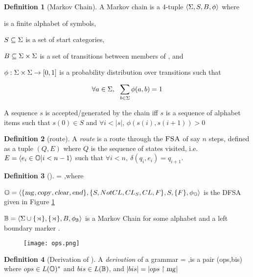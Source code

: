 \documentclass[12pt]{article}
\theoremstyle{definition}
\newtheorem{definition}{Definition}[section]
\begin{document}
\begin{definition}[Markov Chain]
  A Markov chain is a 4-tuple $\langle \Sigma, S, B, \phi  \rangle $ where 

\sg  is a finite alphabet of symbols, 

$S\subseteq \Sigma$ is a set of start categories,
 
$B\subseteq \Sigma\times\Sigma$ is a set of transitions between members of \sg, and

$\phi: \Sigma \times \Sigma \rightarrow [0,1]$ is a probability distribution over transitions such that

$$\forall a\in \Sigma,~~\sum_{b\in\Sigma} \phi(a,b) = 1 $$


A sequence $s$ is accepted/generated by the chain iff $s$ is a sequence of alphabet items such that $s(0) \in S$ and $\forall i<|s|$, $\phi(s(i),s(i+1))>0$ 

\end{definition}

\begin{definition}[route]
  A \emph{route} is a route through the $\textsc{FSA}$ of say $n$ steps, defined as a tuple $(Q,E)$ where $Q$ is the sequence of states visited, i.e.
 $E=\langle e_i\in\mathbb{O}|i<n-1\rangle$ such that $\forall i<n,~ \delta(q_i,e_i)=q_{i+1}$.

\end{definition}

 

\begin{definition}[\OURG]
  \OURG = \la \OPS,\BIGR\ra  where

  $\mathbb{O} = \langle \{\text{\textsl{mg}},\text{\textsl{copy}},\text{\textsl{clear}},\text{\textsl{end}}\}, \{S,NotCL,CL_S,CL,F\}, S, \{F\}, \phi_\mathbb{O}\rangle$ is the DFSA given in Figure \ref{fig:ops}

  $\mathbb{B} = \langle \Sigma\cup\{{\rtimes}\}, \{\rtimes\}, B, \phi_\mathbb{B} \rangle$ is a Markov Chain  for some alphabet \sg and a left boundary marker \LBOUND.
  
\end{definition}


\begin{figure}[H]
  \centering
  \texttt{[image: ops.png]}
  \caption{\OPS}
  \label{fig:ops}
\end{figure}


\begin{definition}[Derivation of \OURG]
  A \textit{derivation} of a grammar \OURG = \la\OPS,\BIGR\ra is a pair (ops,bis) where $ops\in
  L(\mathbb{O})^*$ and $bis\in L(\mathbb{B})$, and  $|bis|=|ops\restriction\text{\textsl{mg}}| $
\end{definition}
\end{document}

